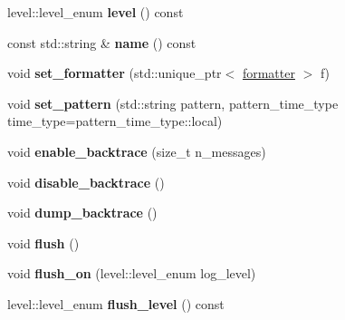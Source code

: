 \begin{DoxyCompactItemize}
\item 
\mbox{\label{classspdlog_1_1logger_a07de3c012b7f11d19ff1007e8aff6a31}} 
level\+::level\+\_\+enum {\bfseries level} () const
\item 
\mbox{\label{classspdlog_1_1logger_ab1f5f63fcc8517b1105b4f640c1143ad}} 
const std\+::string \& {\bfseries name} () const
\item 
\mbox{\label{classspdlog_1_1logger_a109da2030da643440092613cb100b5f0}} 
void {\bfseries set\+\_\+formatter} (std\+::unique\+\_\+ptr$<$ \hyperlink{classspdlog_1_1formatter}{formatter} $>$ f)
\item 
\mbox{\label{classspdlog_1_1logger_a12cd69af480fb8b4059821000a9afd20}} 
void {\bfseries set\+\_\+pattern} (std\+::string pattern, pattern\+\_\+time\+\_\+type time\+\_\+type=pattern\+\_\+time\+\_\+type\+::local)
\item 
\mbox{\label{classspdlog_1_1logger_a815292ea2223b77b86c39bb2e0a98462}} 
void {\bfseries enable\+\_\+backtrace} (size\+\_\+t n\+\_\+messages)
\item 
\mbox{\label{classspdlog_1_1logger_af3803316079e8e814a2f8460aee0dc63}} 
void {\bfseries disable\+\_\+backtrace} ()
\item 
\mbox{\label{classspdlog_1_1logger_adc83cee10165291cd75b100c51e20f3f}} 
void {\bfseries dump\+\_\+backtrace} ()
\item 
\mbox{\label{classspdlog_1_1logger_ae7dacca7ca1d6383d910d2a1c483b6da}} 
void {\bfseries flush} ()
\item 
\mbox{\label{classspdlog_1_1logger_a57179a06ab8a21e4f16e7497302c47db}} 
void {\bfseries flush\+\_\+on} (level\+::level\+\_\+enum log\+\_\+level)
\item 
\mbox{\label{classspdlog_1_1logger_a531a5fdd8cc96405858bf64a272614d3}} 
level\+::level\+\_\+enum {\bfseries flush\+\_\+level} () const
\item 
\mbox{\label{classspdlog_1_1logger_a6d64051f87d3c1c9d01693e1f4d4982b}} 

\end{DoxyCompactItemize}
